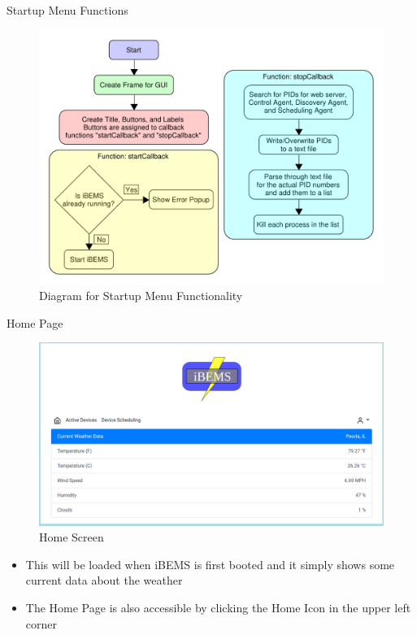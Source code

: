 \documentclass{beamer}
\begin{document}
\begin{frame}{Startup Menu Functions}{}
    \begin{figure}
        \centering
        \includegraphics[scale=0.4]{figs/GUI_Diagram.pdf}
        \caption{Diagram for Startup Menu Functionality}
        \label{fig:GUI_Diagram}
    \end{figure}
\end{frame}

\begin{frame}{Home Page}{} %
    \begin{figure}
        \centering
        \includegraphics[scale=0.2]{figs/Home_screen.png}
        \caption{Home Screen}
        \label{fig:Home_screen}
    \end{figure}
    \begin{block}{}
      \begin{small}
        \begin{itemize}
        \item This will be loaded when iBEMS is first booted and it simply shows some current data about the weather 
        \item The Home Page is also accessible by clicking the Home Icon in the upper left corner
        \end{itemize}
      \end{small}
    \end{block}
\end{frame}
\end{document}
